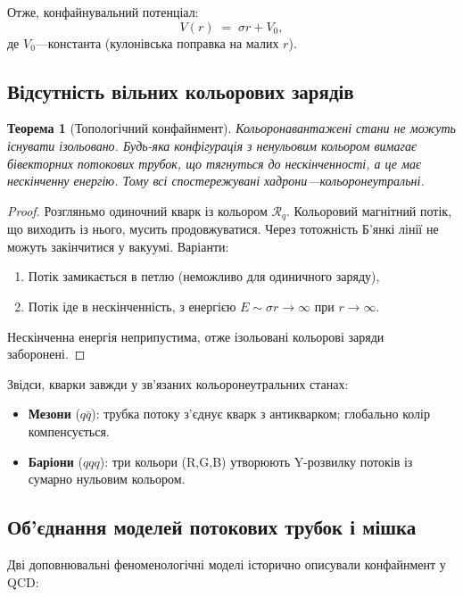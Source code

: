 \documentclass[11pt,a4paper]{article}
\newcommand{\Rotor}{\mathcal{R}}
\theoremstyle{definition}
\theoremstyle{plain}
\newtheorem{theorem}{Теорема}[section]
\theoremstyle{remark}
\begin{document}
Отже, конфайнувальний потенціал:
\begin{equation}
V(r) \;=\; \sigma r + V_0,
\label{eq:linear-potential}
\end{equation}
де $V_0$—константа (кулонівська поправка на малих $r$).

\subsection{Відсутність вільних кольорових зарядів}

\begin{theorem}[Топологічний конфайнмент]
Кольоронавантажені стани не можуть існувати ізольовано. Будь-яка конфігурація з ненульовим кольором вимагає бівекторних потокових трубок, що тягнуться до нескінченності, а це має нескінченну енергію. Тому всі спостережувані хадрони—кольоронеутральні.
\end{theorem}

\begin{proof}
Розгляньмо одиночний кварк із кольором $\Rotor_q$. Кольоровий магнітний потік, що виходить із нього, мусить продовжуватися. Через тотожність Б’янкі лінії не можуть закінчитися у вакуумі. Варіанти:
\begin{enumerate}
  \item Потік замикається в петлю (неможливо для одиничного заряду),
  \item Потік іде в нескінченність, з енергією $E\sim\sigma r\to\infty$ при $r\to\infty$.
\end{enumerate}
Нескінченна енергія неприпустима, отже ізольовані кольорові заряди заборонені.
\end{proof}

Звідси, кварки завжди у зв’язаних кольоронеутральних станах:
\begin{itemize}[leftmargin=*,itemsep=3pt]
  \item \textbf{Мезони} ($q\bar{q}$): трубка потоку з’єднує кварк з антикварком; глобально колір компенсується.
  \item \textbf{Баріони} ($qqq$): три кольори (R,G,B) утворюють Y-розвилку потоків із сумарно нульовим кольором.
\end{itemize}

\subsection{Об'єднання моделей потокових трубок і мішка}

Дві доповнювальні феноменологічні моделі історично описували конфайнмент у QCD:
\end{document}
